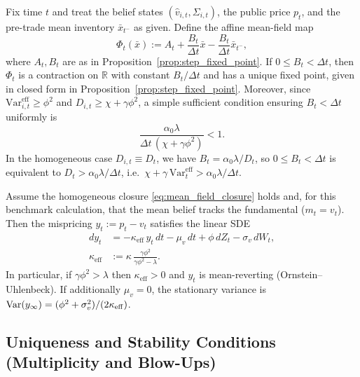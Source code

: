 \begin{theorem}
\label{thm:contraction}
Fix time $t$ and treat the belief states $(\hat v_{i,t},\Sigma_{i,t})$, the public price $p_t$, and the pre-trade mean inventory $\bar x_{t^-}$ as given. Define the affine mean-field map
\begin{equation}
\Phi_t(\bar x) := A_t + \frac{B_t}{\Delta t}\bar x - \frac{B_t}{\Delta t}\bar x_{t^-},
\end{equation}
where $A_t,B_t$ are as in Proposition~\ref{prop:step_fixed_point}. If $0\le B_t<\Delta t$, then $\Phi_t$ is a contraction on $\mathbb R$ with constant $B_t/\Delta t$ and has a unique fixed point, given in closed form in Proposition~\ref{prop:step_fixed_point}.
Moreover, since $\mathrm{Var}^{\mathrm{eff}}_{i,t}\ge \phi^2$ and $D_{i,t}\ge \chi+\gamma\phi^2$, a simple sufficient condition ensuring $B_t<\Delta t$ uniformly is
\begin{equation}
\frac{\alpha_0\lambda}{\Delta t\,(\chi+\gamma\phi^2)}<1.
\label{eq:global_contraction}
\end{equation}
In the homogeneous case $D_{i,t}\equiv D_t$, we have $B_t=\alpha_0\lambda/D_t$, so $0\le B_t<\Delta t$ is equivalent to
$D_t>\alpha_0\lambda/\Delta t$, i.e.\ $\chi+\gamma\,\mathrm{Var}^{\mathrm{eff}}_t>\alpha_0\lambda/\Delta t$.
\end{theorem}

\begin{proposition}
\label{prop:stability}
Assume the homogeneous closure \eqref{eq:mean_field_closure} holds and, for this benchmark calculation, that the mean belief tracks the fundamental ($m_t=v_t$). Then the mispricing $y_t:=p_t-v_t$ satisfies the linear SDE
\begin{equation}
\begin{aligned}
dy_t &= -\kappa_{\mathrm{eff}}\,y_t\,dt - \mu_v\,dt + \phi\,dZ_t - \sigma_v\,dW_t,\\
\kappa_{\mathrm{eff}} &:= \kappa\,\frac{\gamma\phi^2}{\gamma\phi^2-\lambda}.
\end{aligned}
\end{equation}
In particular, if $\gamma\phi^2>\lambda$ then $\kappa_{\mathrm{eff}}>0$ and $y_t$ is mean-reverting (Ornstein--Uhlenbeck). If additionally $\mu_v=0$, the stationary variance is $\text{Var}(y_\infty)=(\phi^2+\sigma_v^2)/(2\kappa_{\mathrm{eff}})$.
\end{proposition}

\subsection{Uniqueness and Stability Conditions (Multiplicity and Blow-Ups)}

